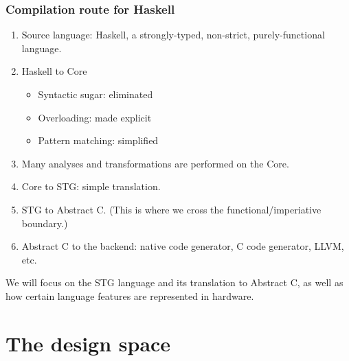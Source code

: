 \documentclass{beamer}
\begin{document}
\begin{frame}
    \frametitle{Compilation route for Haskell}

    \begin{enumerate}
        \item Source language: Haskell, a strongly-typed, non-strict,
            purely-functional language.
        \item Haskell to Core
            \begin{itemize}
                \item Syntactic sugar: eliminated
                \item Overloading: made explicit
                \item Pattern matching: simplified
            \end{itemize}

        \item Many analyses and transformations are performed on the Core.

        \item Core to STG: simple translation.

        \item STG to Abstract C. (This is where we cross the
            functional/imperiative boundary.)

        \item Abstract C to the backend: native code generator, C code
            generator, LLVM, etc.
    \end{enumerate}

    We will focus on the STG language and its translation to Abstract C, as
    well as how certain language features are represented in hardware.
\end{frame}

\section{The design space}
\end{document}
